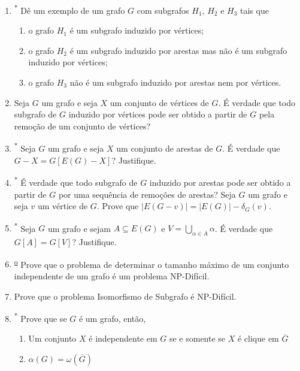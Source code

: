 \begin{enumerate}[label=\textbf{\arabic*.}, ref=\arabic*, resume]
    \item\textsuperscript{*} Dê um exemplo de um grafo $G$ com subgrafos $H_{1}$, $H_{2}$ e $H_{3}$ tais que 
    \begin{enumerate}
        \item o grafo $H_{1}$ é um subgrafo induzido por vértices; 
        \item o grafo $H_{2}$ é um subgrafo induzido por arestas mas não é um subgrafo induzido por vértices; 
        \item o grafo $H_{3}$ não é um subgrafo induzido por arestas nem por vértices. 
    \end{enumerate}
    
    \item Seja $G$ um grafo e seja $X$ um conjunto de vértices de $G$. É verdade que todo subgrafo de $G$ induzido por vértices pode ser obtido a partir de $G$ pela remoção de um conjunto de vértices?
    
    \item\textsuperscript{*} Seja $G$ um grafo e seja $X$ um conjunto de arestas de $G$. É verdade que $G-X=G[E(G)-X]$? Justifique. 
    
    \item\textsuperscript{*} É verdade que todo subgrafo de $G$ induzido por arestas pode ser obtido a partir de $G$ por uma sequência de remoções de arestas?
    Seja $G$ um grafo e seja $v$ um vértice de $G$. Prove que $|E(G-v)|=|E(G)|-\delta_{G}(v)$.
    
    \item\textsuperscript{*} Seja $G$ um grafo e sejam $A\subseteq E(G)$ e $V=\bigcup_{\alpha\in A}\alpha$. É verdade que $G[A]=G[V]$? Justifique. 
    
    \item\textsuperscript{\underline{o}} Prove que o problema de determinar o tamanho máximo de um conjunto independente de um grafo é um problema NP-Difícil.
    
    \item Prove que o problema Isomorfismo de Subgrafo é NP-Difícil.
    
    \item\textsuperscript{*} Prove que se $G$ é um grafo, então, 
    
    \begin{enumerate}
        \item Um conjunto $X$ é independente em $G$ se e somente se $X$ é clique em $\overline{G}$
        \item $\alpha(G)=\omega(\overline{G})$ 
    \end{enumerate}
    

\end{enumerate}
